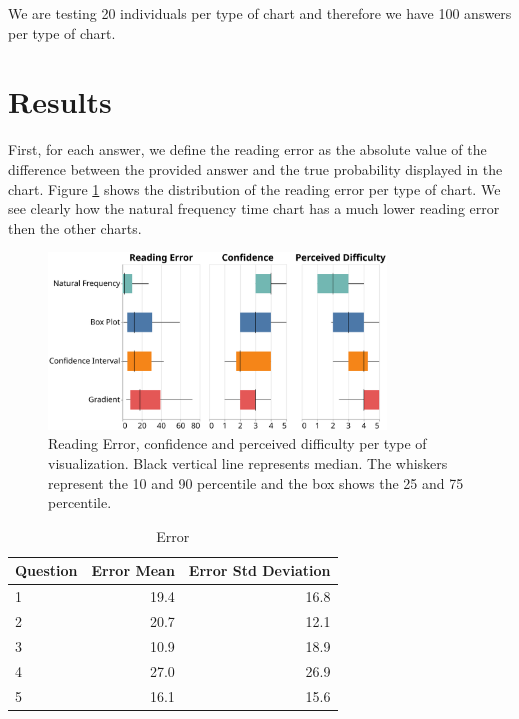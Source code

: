 \documentclass[a4paper,3p,sort&compress]{elsarticle}
\begin{document}
We are testing 20 individuals per type of chart and therefore we have 100 answers per 
type of chart.

\section{Results}
\label{sec:results}

First, for each answer, we define the 
reading error as the absolute value of the difference 
between the provided answer and the true probability displayed in the chart. Figure \ref{figure:errors} shows 
the distribution of the reading error per type of chart. We see clearly how the natural frequency time chart
has a much lower reading error then the other charts. 

\begin{figure}
  \centering
  \includegraphics[width=0.8\textwidth]{comparison}
  \caption{\label{figure:errors}Reading Error, confidence and perceived difficulty per 
  type of visualization. Black vertical line represents median.
  The whiskers represent the 10 and 90 percentile and the box shows the 25 and 
  75 percentile.}
\end{figure}


\begin{table}[h!]
  \centering
  \begin{tabular}{lrr}
    \toprule
    {}Question &     Error Mean &        Error Std Deviation \\
    \midrule
    1 &  19.4 &  16.8 \\
    2 &  20.7 &  12.1 \\
    3 &  10.9 &  18.9 \\
    4 &  27.0 &  26.9 \\
    5 &  16.1 &  15.6 \\
    \bottomrule
    \end{tabular}
  \caption{Error}
  \label{table:resultsperquestion}
  \end{table}
\end{document}
